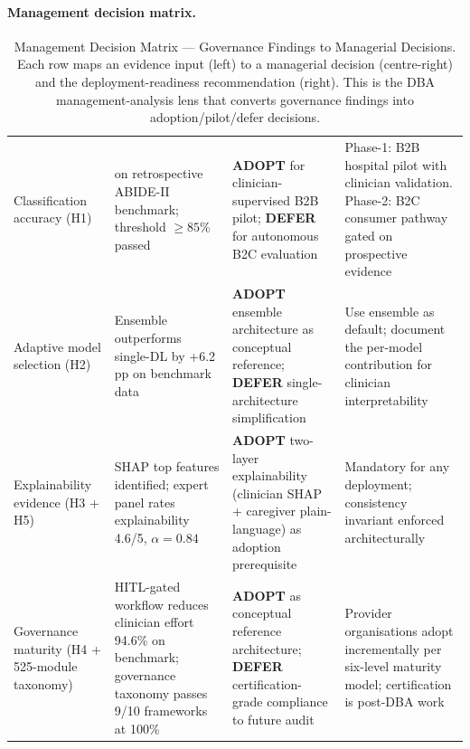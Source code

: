 \paragraph{Management decision matrix.}
\label{para:management_decision_matrix}
{\tablestripes\tablefontsize

\begin{xltabular}{\textwidth}{@{} >{\raggedright\arraybackslash}p{2.5cm} >{\raggedright\arraybackslash}p{3.7cm} >{\raggedright\arraybackslash}p{3.9cm} p{4.1cm} @{}}
\caption[Management Decision Matrix]{Management Decision Matrix --- Governance Findings to Managerial Decisions. Each row maps an evidence input (left) to a managerial decision (centre-right) and the deployment-readiness recommendation (right). This is the DBA management-analysis lens that converts governance findings into adoption/pilot/defer decisions.}\label{tab:management_decision_matrix} \\
\toprule
{} &  &  &  \\
\midrule
\endfirsthead
\endhead
\bottomrule
\endlastfoot
Classification accuracy (H1) & \asdacc{} on retrospective ABIDE-II benchmark; threshold $\geq 85\%$ passed & \textbf{ADOPT} for clinician-supervised B2B pilot; \textbf{DEFER} for autonomous B2C evaluation & Phase-1: B2B hospital pilot with clinician validation. Phase-2: B2C consumer pathway gated on prospective evidence \\
\addlinespace
Adaptive model selection (H2) & Ensemble outperforms single-DL by +6.2 pp on benchmark data & \textbf{ADOPT} ensemble architecture as conceptual reference; \textbf{DEFER} single-architecture simplification & Use ensemble as default; document the per-model contribution for clinician interpretability \\
\addlinespace
Explainability evidence (H3 + H5) & SHAP top features identified; expert panel rates explainability 4.6/5, $\alpha = 0.84$ & \textbf{ADOPT} two-layer explainability (clinician SHAP + caregiver plain-language) as adoption prerequisite & Mandatory for any deployment; consistency invariant enforced architecturally \\
\addlinespace
Governance maturity (H4 + 525-module taxonomy) & HITL-gated workflow reduces clinician effort 94.6\% on benchmark; governance taxonomy passes 9/10 frameworks at 100\% & \textbf{ADOPT} as conceptual reference architecture; \textbf{DEFER} certification-grade compliance to future audit & Provider organisations adopt incrementally per six-level maturity model; certification is post-DBA work \\

\end{xltabular}}
